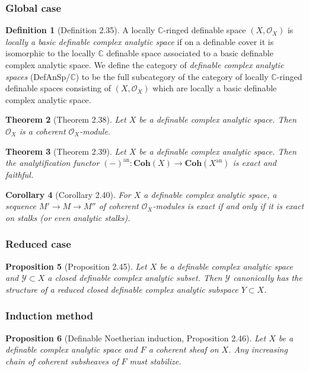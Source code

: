 \documentclass{amsart}
\newtheorem{theorem}{Theorem}[subsection]
\newtheorem{proposition}[theorem]{Proposition}
\newtheorem{corollary}[theorem]{Corollary}
\theoremstyle{definition}
\newtheorem{definition}[theorem]{Definition}
\numberwithin{equation}{section}
\newcommand{\analytic}{\mathrm{an}}
\begin{document}
\subsubsection{Global case}
\begin{definition}[Definition 2.35]
	A locally $\mathbb{C}$-ringed definable space $(X,\mathcal{O}_X)$ is \emph{locally a basic definable complex analytic space}
	if on a definable cover it is isomorphic to the locally $\mathbb{C}$ definable space
	associated to a basic definable complex analytic space.
	We define the category of \emph{definable complex analytic spaces} (DefAnSp/$\mathbb{C}$) to be
	the full subcategory of the category of locally $\mathbb{C}$-ringed definable spaces consisting of $(X,\mathcal{O}_X)$
	which are locally a basic definable complex analytic space.
\end{definition}

\begin{theorem}[Theorem 2.38]
	Let $X$ be a definable complex analytic space.
	Then $\mathcal{O}_X$ is a coherent $\mathcal{O}_X$-module.
\end{theorem}

\begin{theorem}[Theorem 2.39]
	Let $X$ be a definable complex analytic space.
	Then the analytification functor
	$(-)^{\analytic}: \mathbf{Coh}(X) \to \mathbf{Coh}(X^{\analytic})$ is exact and faithful.
\end{theorem}

\begin{corollary}[Corollary 2.40]
	For $X$ a definable complex analytic space,
	a sequence $M' \to M \to M''$ of coherent $\mathcal{O}_X$-modules
	is exact if and only if it is exact on stalks (or even analytic stalks).
\end{corollary}

\subsubsection{Reduced case}
\begin{proposition}[Proposition 2.45]
	Let $X$ be a definable complex analytic space and
	$\mathcal{Y} \subset X$ a closed definable complex analytic subset.
	Then $\mathcal{Y}$ canonically has the structure of a reduced closed definable complex analytic subspace $Y \subset X$.
\end{proposition}

\subsubsection{Induction method}
\begin{proposition}[Definable Noetherian induction, Proposition 2.46]
	Let $X$ be a definable complex analytic space and $F$ a coherent sheaf on $X$.
	Any increasing chain of coherent subsheaves of $F$ must stabilize.
\end{proposition}
\end{document}
